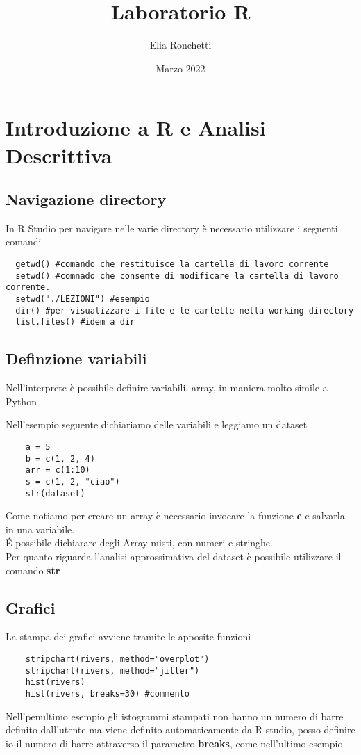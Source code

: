 \documentclass[12pt, a4paper, openany]{book}
\begin{document}
\title{Laboratorio R}
\author{Elia Ronchetti}
\date{Marzo 2022}

\maketitle
\tableofcontents
\chapter{Introduzione a R e Analisi Descrittiva}
\section{Navigazione directory}
In R Studio per navigare nelle varie directory è necessario utilizzare i seguenti comandi
\begin{lstlisting}
  getwd() #comando che restituisce la cartella di lavoro corrente
  setwd() #comnado che consente di modificare la cartella di lavoro corrente.
  setwd("./LEZIONI") #esempio
  dir() #per visualizzare i file e le cartelle nella working directory
  list.files() #idem a dir
\end{lstlisting}

\section{Definzione variabili}
Nell'interprete è possibile definire variabili, array, in maniera molto simile
a Python

Nell'esempio seguente dichiariamo delle variabili e leggiamo un dataset
\begin{lstlisting}
    a = 5
    b = c(1, 2, 4)
    arr = c(1:10)
    s = c(1, 2, "ciao")
    str(dataset)
\end{lstlisting}


Come notiamo per creare un array è necessario invocare la funzione \textbf{c} e salvarla in una variabile.
\\ \'E possibile dichiarare degli Array misti, con numeri e stringhe.
\\ Per quanto riguarda l'analisi approssimativa del dataset è possibile utilizzare il
comando \textbf{str}

\section{Grafici}
La stampa dei grafici avviene tramite le apposite funzioni
\begin{lstlisting}
    stripchart(rivers, method="overplot")
    stripchart(rivers, method="jitter")
    hist(rivers)
    hist(rivers, breaks=30) #commento
\end{lstlisting}
Nell'penultimo esempio gli istogrammi stampati non hanno un numero di barre definito dall'utente
ma viene definito automaticamente da R studio, posso definire io il numero di barre attraverso
il parametro \textbf{breaks}, come nell'ultimo esempio 
\end{document}
